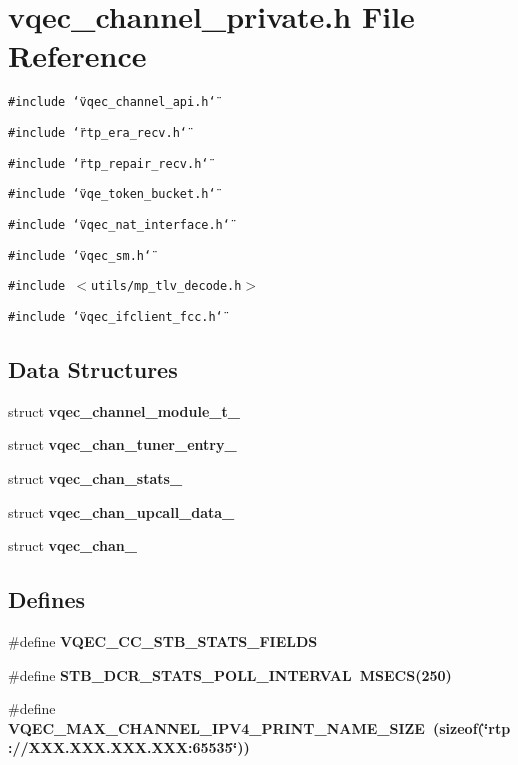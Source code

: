 \section{vqec\_\-channel\_\-private.h File Reference}
\label{vqec__channel__private_8h}
{\tt \#include \char`\"{}vqec\_\-channel\_\-api.h\char`\"{}}\par
{\tt \#include \char`\"{}rtp\_\-era\_\-recv.h\char`\"{}}\par
{\tt \#include \char`\"{}rtp\_\-repair\_\-recv.h\char`\"{}}\par
{\tt \#include \char`\"{}vqe\_\-token\_\-bucket.h\char`\"{}}\par
{\tt \#include \char`\"{}vqec\_\-nat\_\-interface.h\char`\"{}}\par
{\tt \#include \char`\"{}vqec\_\-sm.h\char`\"{}}\par
{\tt \#include $<$utils/mp\_\-tlv\_\-decode.h$>$}\par
{\tt \#include \char`\"{}vqec\_\-ifclient\_\-fcc.h\char`\"{}}\par
\subsection*{Data Structures}
\begin{CompactItemize}
\item 
struct \bf{vqec\_\-channel\_\-module\_\-t\_\-}
\item 
struct \bf{vqec\_\-chan\_\-tuner\_\-entry\_\-}
\item 
struct \bf{vqec\_\-chan\_\-stats\_\-}
\item 
struct \bf{vqec\_\-chan\_\-upcall\_\-data\_\-}
\item 
struct \bf{vqec\_\-chan\_\-}
\end{CompactItemize}
\subsection*{Defines}
\begin{CompactItemize}
\item 
\#define \bf{VQEC\_\-CC\_\-STB\_\-STATS\_\-FIELDS}
\item 
\#define \bf{STB\_\-DCR\_\-STATS\_\-POLL\_\-INTERVAL}~MSECS(250)
\item 
\#define \bf{VQEC\_\-MAX\_\-CHANNEL\_\-IPV4\_\-PRINT\_\-NAME\_\-SIZE}~(sizeof(\char`\"{}rtp://XXX.XXX.XXX.XXX:65535\char`\"{}))
\end{CompactItemize}
